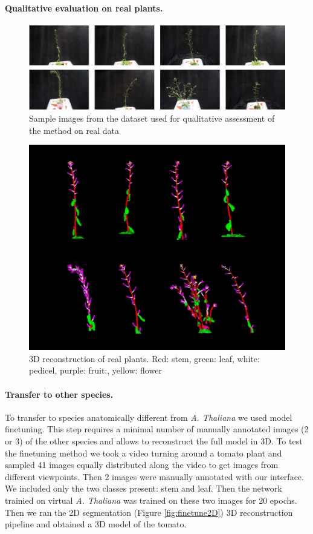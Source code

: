 \paragraph{Qualitative evaluation on real plants.}

\begin{figure}
    \centering \includegraphics[width = \linewidth]{figures/seg-crop.pdf}
    \caption{Sample images from the dataset used for qualitative assessment of the method on real data} \label{fig:realscans}
\end{figure}

\begin{figure}
    \centering \includegraphics[width = 0.7\linewidth]{figures/capture.png}
    \caption{3D reconstruction of real plants. Red: stem, green: leaf, white: pedicel, purple: fruit:, yellow: flower} \label{fig:rec3d}
\end{figure}

\paragraph{Transfer to other species.}
To transfer to species anatomically different from \emph{A. Thaliana} we used model finetuning. This step requires a minimal number of manually annotated images (2 or 3) of the other species and allows to reconstruct the full model in 3D. To test the finetuning method we took a video turning around a tomato plant and sampled 41 images equally distributed along the video to get images from different viewpoints. Then 2 images were manually annotated with our interface. We included only the two classes present: stem and leaf. Then the network trainied on virtual \emph{A. Thaliana} was trained on these two images for 20 epochs. Then we ran the 2D segmentation (Figure \ref{fig:finetune2D}) 3D reconstruction pipeline and obtained a 3D model of the tomato.

